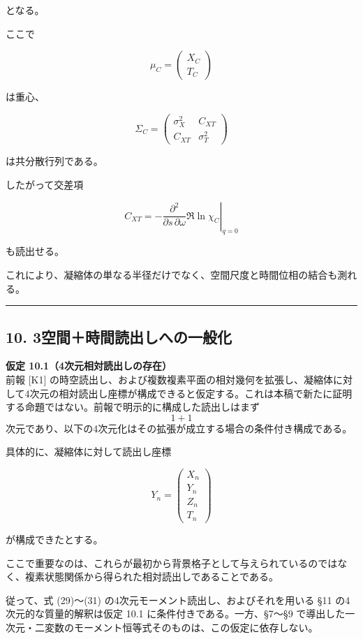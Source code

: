 \documentclass[
  a4paper,
]{ltjsarticle}
\begin{document}
となる。

ここで

\[
\mu_C
=
\begin{pmatrix}
X_C\\
T_C
\end{pmatrix}
\]

は重心、

\[
\Sigma_C
=
\begin{pmatrix}
\sigma_X^2 & C_{XT}\\
C_{XT} & \sigma_T^2
\end{pmatrix}
\]

は共分散行列である。

したがって交差項

\[
\boxed{
C_{XT}
=
-
\left.
\frac{\partial^2}
{\partial s\,\partial\omega}
\Re\ln\chi_C
\right|_{q=0}
}
\tag{28}
\]

も読出せる。

これにより、凝縮体の単なる半径だけでなく、空間尺度と時間位相の結合も測れる。

\begin{center}\rule{0.5\linewidth}{0.5pt}\end{center}

\subsection{10.
3空間＋時間読出しへの一般化}\label{ux7a7aux9593ux6642ux9593ux8aadux51faux3057ux3078ux306eux4e00ux822cux5316}

\textbf{仮定 10.1（4次元相対読出しの存在）}\\
前報 {[}K1{]}
の時空読出し、および複数複素平面の相対幾何を拡張し、凝縮体に対して4次元の相対読出し座標が構成できると仮定する。これは本稿で新たに証明する命題ではない。前報で明示的に構成した読出しはまず
\[1+1\]
次元であり、以下の4次元化はその拡張が成立する場合の条件付き構成である。

具体的に、凝縮体に対して読出し座標

\[
Y_n
=
\begin{pmatrix}
X_n\\
Y_n\\
Z_n\\
T_n
\end{pmatrix}
\]

が構成できたとする。

ここで重要なのは、これらが最初から背景格子として与えられているのではなく、複素状態関係から得られた相対読出しであることである。

従って、式 (29)〜(31) の4次元モーメント読出し、およびそれを用いる §11
の4次元的な質量的解釈は仮定 10.1 に条件付きである。一方、§7〜§9
で導出した一次元・二変数のモーメント恒等式そのものは、この仮定に依存しない。
\end{document}
